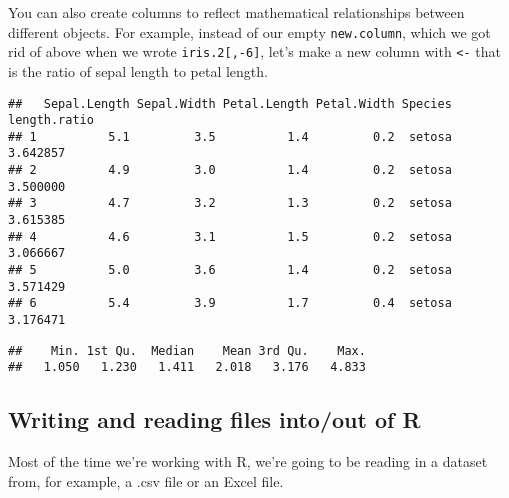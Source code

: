 \documentclass[]{article}
\newenvironment{Shaded}{\begin{snugshade}}{\end{snugshade}}
\newcommand{\KeywordTok}[1]{\textcolor[rgb]{0.13,0.29,0.53}{\textbf{#1}}}
\newcommand{\DecValTok}[1]{\textcolor[rgb]{0.00,0.00,0.81}{#1}}
\newcommand{\StringTok}[1]{\textcolor[rgb]{0.31,0.60,0.02}{#1}}
\newcommand{\OperatorTok}[1]{\textcolor[rgb]{0.81,0.36,0.00}{\textbf{#1}}}
\newcommand{\NormalTok}[1]{#1}
\begin{document}
You can also create columns to reflect mathematical relationships
between different objects. For example, instead of our empty
\texttt{new.column}, which we got rid of above when we wrote
\texttt{iris.2{[},-6{]}}, let's make a new column with
\texttt{\textless{}-} that is the ratio of sepal length to petal length.

\begin{Shaded}
\end{Shaded}

\begin{verbatim}
##   Sepal.Length Sepal.Width Petal.Length Petal.Width Species length.ratio
## 1          5.1         3.5          1.4         0.2  setosa     3.642857
## 2          4.9         3.0          1.4         0.2  setosa     3.500000
## 3          4.7         3.2          1.3         0.2  setosa     3.615385
## 4          4.6         3.1          1.5         0.2  setosa     3.066667
## 5          5.0         3.6          1.4         0.2  setosa     3.571429
## 6          5.4         3.9          1.7         0.4  setosa     3.176471
\end{verbatim}

\begin{Shaded}
\end{Shaded}

\begin{verbatim}
##    Min. 1st Qu.  Median    Mean 3rd Qu.    Max. 
##   1.050   1.230   1.411   2.018   3.176   4.833
\end{verbatim}

\subsection{Writing and reading files into/out of
R}\label{writing-and-reading-files-intoout-of-r}

Most of the time we're working with R, we're going to be reading in a
dataset from, for example, a .csv file or an Excel file.
\end{document}
